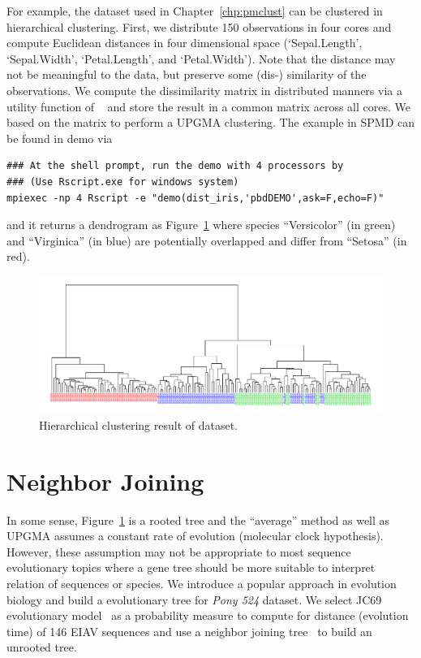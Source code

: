 For example, the  dataset used in Chapter~\ref{chp:pmclust} can be
clustered in hierarchical clustering. First, we distribute 150 observations
in four cores and compute Euclidean distances in four dimensional space
(`Sepal.Length', `Sepal.Width', `Petal.Length', and `Petal.Width').
Note that the distance may not be meaningful to the data, but preserve
some (dis-) similarity of the observations.
We compute the dissimilarity matrix in distributed manners via a
utility function 
of ~\citep{Chen2012pbdMPIpackage}
and store the result in a common matrix across all cores. We based on
the matrix to perform a UPGMA clustering. The example in SPMD can be
found in demo via
\begin{lstlisting}
### At the shell prompt, run the demo with 4 processors by
### (Use Rscript.exe for windows system)
mpiexec -np 4 Rscript -e "demo(dist_iris,'pbdDEMO',ask=F,echo=F)"
\end{lstlisting}
and it returns a dendrogram as Figure~\ref{fig:dist_iris}
where species ``Versicolor'' (in green) and ``Virginica'' (in blue)
are potentially overlapped and differ from ``Setosa'' (in red).

\begin{figure}[h!tb]
\centering
 \includegraphics[width=6.5in]{pbdDEMO-include/pics/dist_iris}
\caption{Hierarchical clustering result of  dataset.}
\label{fig:dist_iris}
\end{figure}


\section{Neighbor Joining}

In some sense, Figure~\ref{fig:dist_iris} is a rooted tree and the
``average'' method as well as UPGMA assumes a constant rate of evolution
(molecular clock hypothesis). However, these assumption may not be
appropriate to most sequence evolutionary topics where a gene tree should
be more suitable to interpret relation of sequences or species.
We introduce a popular approach in evolution biology and build a
evolutionary tree for {\it Pony 524} dataset.
We select JC69 evolutionary model~\citep{Jukes1969} as a probability measure
to compute for distance (evolution time) of 146 EIAV sequences and
use a neighbor joining tree~\citep{Saitou1987} to build an unrooted tree.

